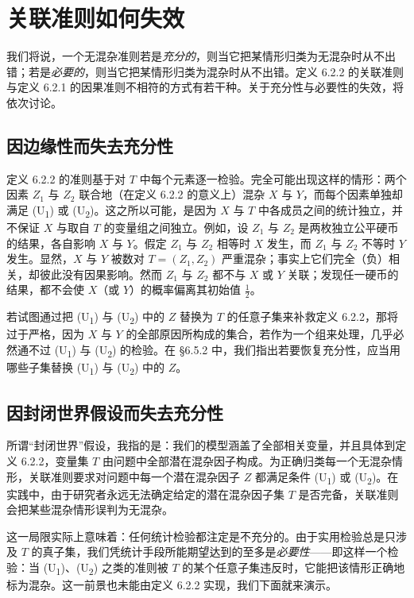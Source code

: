 \section{关联准则如何失效}

我们将说，一个无混杂准则若是\emph{充分的}，则当它把某情形归类为无混杂时从不出错；若是\emph{必要的}，则当它把某情形归类为混杂时从不出错。定义 6.2.2 的关联准则与定义 6.2.1 的因果准则不相符的方式有若干种。关于充分性与必要性的失效，将依次讨论。

\subsection{因边缘性而失去充分性}

定义 6.2.2 的准则基于对 $T$ 中每个元素逐一检验。完全可能出现这样的情形：两个因素 $Z_1$ 与 $Z_2$ 联合地（在定义 6.2.2 的意义上）混杂 $X$ 与 $Y$，而每个因素单独却满足 (U\textsubscript{1}) 或 (U\textsubscript{2})。这之所以可能，是因为 $X$ 与 $T$ 中各成员之间的统计独立，并不保证 $X$ 与取自 $T$ 的变量组之间独立。例如，设 $Z_1$ 与 $Z_2$ 是两枚独立公平硬币的结果，各自影响 $X$ 与 $Y$。假定 $Z_1$ 与 $Z_2$ 相等时 $X$ 发生，而 $Z_1$ 与 $Z_2$ 不等时 $Y$ 发生。显然，$X$ 与 $Y$ 被数对 $T=(Z_1,Z_2)$ 严重混杂；事实上它们完全（负）相关，却彼此没有因果影响。然而 $Z_1$ 与 $Z_2$ 都不与 $X$ 或 $Y$ 关联；发现任一硬币的结果，都不会使 $X$（或 $Y$）的概率偏离其初始值 $\tfrac12$。

若试图通过把 (U\textsubscript{1}) 与 (U\textsubscript{2}) 中的 $Z$ 替换为 $T$ 的任意子集来补救定义 6.2.2，那将过于严格，因为 $X$ 与 $Y$ 的全部原因所构成的集合，若作为一个组来处理，几乎必然通不过 (U\textsubscript{1}) 与 (U\textsubscript{2}) 的检验。在 \S 6.5.2 中，我们指出若要恢复充分性，应当用哪些子集替换 (U\textsubscript{1}) 与 (U\textsubscript{2}) 中的 $Z$。

\subsection{因封闭世界假设而失去充分性}

所谓“封闭世界”假设，我指的是：我们的模型涵盖了全部相关变量，并且具体到定义 6.2.2，变量集 $T$ 由问题中全部潜在混杂因子构成。为正确归类每一个无混杂情形，关联准则要求对问题中每一个潜在混杂因子 $Z$ 都满足条件 (U\textsubscript{1}) 或 (U\textsubscript{2})。在实践中，由于研究者永远无法确定给定的潜在混杂因子集 $T$ 是否完备，关联准则会把某些混杂情形误判为无混杂。

这一局限实际上意味着：任何统计检验都注定是不充分的。由于实用检验总是只涉及 $T$ 的真子集，我们凭统计手段所能期望达到的至多是\emph{必要性}——即这样一个检验：当 (U\textsubscript{1})、(U\textsubscript{2}) 之类的准则被 $T$ 的某个任意子集违反时，它能把该情形正确地标为混杂。这一前景也未能由定义 6.2.2 实现，我们下面就来演示。

